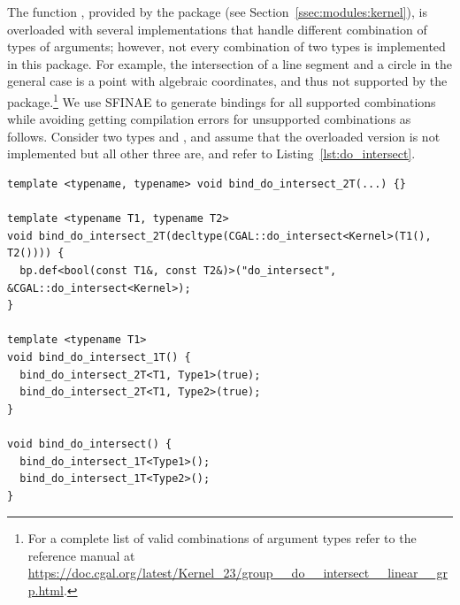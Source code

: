 The function , provided by the  \iiDandiiiDGeometryKernelPackage{} package (see Section~\ref{ssec:modules:kernel}), is overloaded with several implementations that handle different combination of types of arguments; however, not every combination of two types is implemented in this package. For example, the intersection of a line segment and a circle in the general case is a point with algebraic coordinates, and thus not supported by the package.\footnote{For a complete list of valid combinations of  argument types refer to the reference manual at
\url{https://doc.cgal.org/latest/Kernel_23/group__do__intersect__linear__grp.html}.} We use SFINAE to generate bindings for all supported combinations while avoiding getting compilation errors for unsupported combinations as follows. Consider two types  and , and assume that the  overloaded version is not implemented but all other three are, and refer to Listing~\ref{lst:do_intersect}.

\begin{lstfloat}
\begin{lstlisting}[style=cppFramedStyle,basicstyle=\scriptsize,%
                   label={lst:do_intersect},%
                   caption={Automatic generation of binding  for \cppLstinline{CGAL::do_intersect()} exploiting SFINAE}]
template <typename, typename> void bind_do_intersect_2T(...) {}

template <typename T1, typename T2>
void bind_do_intersect_2T(decltype(CGAL::do_intersect<Kernel>(T1(), T2()))) {
  bp.def<bool(const T1&, const T2&)>("do_intersect", &CGAL::do_intersect<Kernel>);
}

template <typename T1>
void bind_do_intersect_1T() {
  bind_do_intersect_2T<T1, Type1>(true);
  bind_do_intersect_2T<T1, Type2>(true);
}

void bind_do_intersect() {
  bind_do_intersect_1T<Type1>();
  bind_do_intersect_1T<Type2>();
}
\end{lstlisting}
\end{lstfloat}

